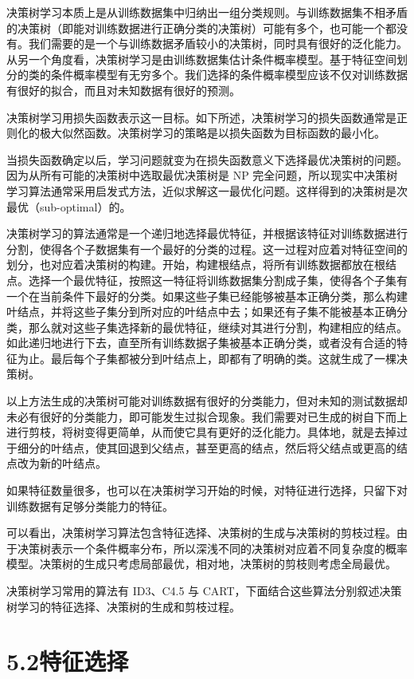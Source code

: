 \documentclass[UTF8,12pt,a4paper,fontset=fandol]{ctexart}
\begin{document}
决策树学习本质上是从训练数据集中归纳出一组分类规则。与训练数据集不相矛盾的决策树（即能对训练数据进行正确分类的决策树）可能有多个，也可能一个都没有。我们需要的是一个与训练数据矛盾较小的决策树，同时具有很好的泛化能力。从另一个角度看，决策树学习是由训练数据集估计条件概率模型。基于特征空间划分的类的条件概率模型有无穷多个。我们选择的条件概率模型应该不仅对训练数据有很好的拟合，而且对未知数据有很好的预测。

决策树学习用损失函数表示这一目标。如下所述，决策树学习的损失函数通常是正则化的极大似然函数。决策树学习的策略是以损失函数为目标函数的最小化。

当损失函数确定以后，学习问题就变为在损失函数意义下选择最优决策树的问题。因为从所有可能的决策树中选取最优决策树是 NP 完全问题，所以现实中决策树学习算法通常采用启发式方法，近似求解这一最优化问题。这样得到的决策树是次最优（sub-optimal）的。

决策树学习的算法通常是一个递归地选择最优特征，并根据该特征对训练数据进行分割，使得各个子数据集有一个最好的分类的过程。这一过程对应着对特征空间的划分，也对应着决策树的构建。开始，构建根结点，将所有训练数据都放在根结点。选择一个最优特征，按照这一特征将训练数据集分割成子集，使得各个子集有一个在当前条件下最好的分类。如果这些子集已经能够被基本正确分类，那么构建叶结点，并将这些子集分到所对应的叶结点中去；如果还有子集不能被基本正确分类，那么就对这些子集选择新的最优特征，继续对其进行分割，构建相应的结点。如此递归地进行下去，直至所有训练数据子集被基本正确分类，或者没有合适的特征为止。最后每个子集都被分到叶结点上，即都有了明确的类。这就生成了一棵决策树。

以上方法生成的决策树可能对训练数据有很好的分类能力，但对未知的测试数据却未必有很好的分类能力，即可能发生过拟合现象。我们需要对已生成的树自下而上进行剪枝，将树变得更简单，从而使它具有更好的泛化能力。具体地，就是去掉过于细分的叶结点，使其回退到父结点，甚至更高的结点，然后将父结点或更高的结点改为新的叶结点。

如果特征数量很多，也可以在决策树学习开始的时候，对特征进行选择，只留下对训练数据有足够分类能力的特征。

可以看出，决策树学习算法包含特征选择、决策树的生成与决策树的剪枝过程。由于决策树表示一个条件概率分布，所以深浅不同的决策树对应着不同复杂度的概率模型。决策树的生成只考虑局部最优，相对地，决策树的剪枝则考虑全局最优。

决策树学习常用的算法有 ID3、C4.5 与 CART，下面结合这些算法分别叙述决策树学习的特征选择、决策树的生成和剪枝过程。

\section*{5.2\quad 特征选择}
\end{document}
